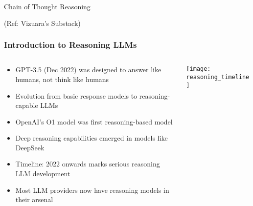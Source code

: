 \begin{frame}[fragile]\frametitle{}
\begin{center}
{\Large Chain of Thought Reasoning}

{\tiny (Ref: Vizuara's Substack)}

\end{center}

\end{frame}


\begin{frame}[fragile]\frametitle{Introduction to Reasoning LLMs}
\begin{columns}
    \begin{column}[T]{0.6\linewidth}
      \begin{itemize}
        \item GPT-3.5 (Dec 2022) was designed to answer like humans, not think like humans
        \item Evolution from basic response models to reasoning-capable LLMs
        \item OpenAI's O1 model was first reasoning-based model
        \item Deep reasoning capabilities emerged in models like DeepSeek
        \item Timeline: 2022 onwards marks serious reasoning LLM development
        \item Most LLM providers now have reasoning models in their arsenal
      \end{itemize}
    \end{column}
    \begin{column}[T]{0.4\linewidth}
        \begin{center}
        \texttt{[image: reasoning\_timeline]}
        \end{center}	
    \end{column}
  \end{columns}
\end{frame}

